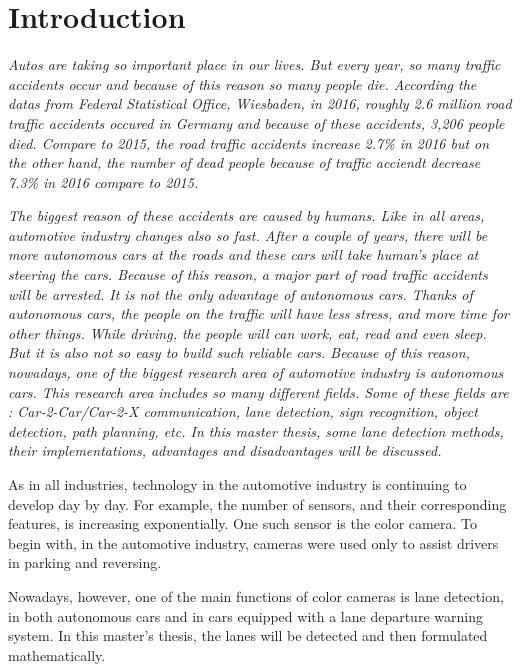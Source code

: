 
\chapter{Introduction}\label{cha:Intro}

\emph{\color{blue}Autos are taking so important place in our lives. But every year, so many traffic accidents occur and because of this reason so many people die. According the datas from  Federal Statistical Office, Wiesbaden, in 2016, roughly 2.6 million road traffic accidents occured in Germany and because of these accidents, 3,206 people died. Compare to 2015, the road traffic accidents increase 2.7\% in 2016 but on the other hand, the number of dead people because of traffic acciendt decrease 7.3\% in 2016 compare to 2015\cite{Statis}.}

\emph{\color{blue}The biggest reason of these accidents are caused by humans. Like in all areas, automotive industry changes also so fast. After a couple of years, there will be more autonomous cars at the roads and these cars will take human's place at steering the cars. Because of this reason, a major part of road traffic accidents will be arrested. It is not the only advantage of autonomous cars. Thanks of autonomous cars, the people on the traffic will have less stress, and more time for other things. While driving, the people will can work, eat, read and even sleep. But it is also not so easy to build such reliable cars. Because of this reason, nowadays, one of the biggest research area of automotive industry is autonomous cars. This research area includes so many different fields. Some of these fields are : Car-2-Car/Car-2-X communication, lane detection, sign recognition, object detection, path planning, etc. In this master thesis, some lane detection methods, their implementations, advantages and disadvantages will be discussed.}

As in all industries, technology in the automotive industry is continuing to develop day by day. For example, the number of sensors, and their corresponding features, is increasing exponentially. One such sensor is the color camera. To begin with, in the automotive industry, cameras were used only to assist drivers in parking and reversing.
 
Nowadays, however, one of the main functions of color cameras is lane detection, in both autonomous cars and in cars equipped with a lane departure warning system. In this master's thesis, the lanes will be detected and then formulated mathematically.

